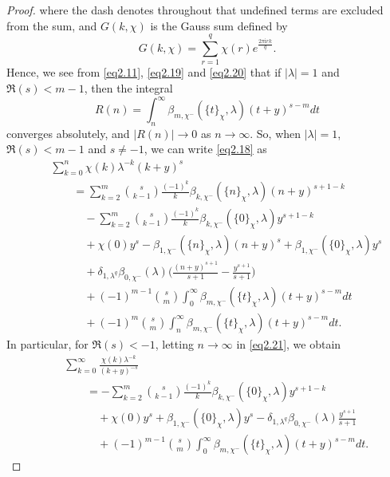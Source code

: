 \documentclass[reqno]{amsart}
\numberwithin{equation}{section}
\begin{document}
\begin{proof}
where the dash denotes throughout that undefined terms are excluded from the sum, and $G(k,\chi)$ is the Gauss sum defined by
\begin{equation*}
G(k,\chi)=\sum_{r=1}^{q}\chi(r)e^{\frac{2\pi \mathrm{i}rk}{q}}.
\end{equation*}
Hence, we see from \eqref{eq2.11}, \eqref{eq2.19} and \eqref{eq2.20} that if $|\lambda|=1$ and $\Re(s)<m-1$, then the integral
\begin{equation*}
R(n)=\int_{n}^{\infty}\beta_{m,\chi^{-}}(\{t\}_{\chi},\lambda)(t+y)^{s-m}dt
\end{equation*}
converges absolutely, and $|R(n)|\rightarrow0$ as $n\rightarrow\infty$. So, when $|\lambda|=1$, $\Re(s)<m-1$ and $s\neq-1$, we can write \eqref{eq2.18} as
\begin{eqnarray}\label{eq2.21}
&&\sum_{k=0}^{n}\chi(k)\lambda^{-k}(k+y)^{s}\nonumber\\
&&\qquad=\sum_{k=2}^{m}\binom{s}{k-1}\frac{(-1)^{k}}{k}\beta_{k,\chi^{-}}(\{n\}_{\chi},\lambda)(n+y)^{s+1-k}\nonumber\\
&&\qquad\quad-\sum_{k=2}^{m}\binom{s}{k-1}\frac{(-1)^{k}}{k}\beta_{k,\chi^{-}}(\{0\}_{\chi},\lambda)y^{s+1-k}\nonumber\\
&&\qquad\quad+\chi(0)y^{s}-\beta_{1,\chi^{-}}(\{n\}_{\chi},\lambda)(n+y)^{s}+\beta_{1,\chi^{-}}(\{0\}_{\chi},\lambda)y^{s}\nonumber\\
&&\qquad\quad+\delta_{1,\lambda^{q}}\beta_{0,\chi^{-}}(\lambda)\biggl(\frac{(n+y)^{s+1}}{s+1}-\frac{y^{s+1}}{s+1}\biggl)\nonumber\\
&&\qquad\quad+(-1)^{m-1}\binom{s}{m}\int_{0}^{\infty}\beta_{m,\chi^{-}}(\{t\}_{\chi},\lambda)(t+y)^{s-m}dt\nonumber\\
&&\qquad\quad+(-1)^{m}\binom{s}{m}\int_{n}^{\infty}\beta_{m,\chi^{-}}(\{t\}_{\chi},\lambda)(t+y)^{s-m}dt.
\end{eqnarray}
In particular, for $\Re(s)<-1$, letting $n\rightarrow\infty$ in \eqref{eq2.21}, we obtain
\begin{eqnarray}\label{eq2.22}
&&\sum_{k=0}^{\infty}\frac{\chi(k)\lambda^{-k}}{(k+y)^{-s}}\nonumber\\
&&\qquad=-\sum_{k=2}^{m}\binom{s}{k-1}\frac{(-1)^{k}}{k}\beta_{k,\chi^{-}}(\{0\}_{\chi},\lambda)y^{s+1-k}\nonumber\\
&&\qquad\quad+\chi(0)y^{s}+\beta_{1,\chi^{-}}(\{0\}_{\chi},\lambda)y^{s}-\delta_{1,\lambda^{q}}\beta_{0,\chi^{-}}(\lambda)\frac{y^{s+1}}{s+1}\nonumber\\
&&\qquad\quad+(-1)^{m-1}\binom{s}{m}\int_{0}^{\infty}\beta_{m,\chi^{-}}(\{t\}_{\chi},\lambda)(t+y)^{s-m}dt.

\end{eqnarray}
\end{proof}
\end{document}
